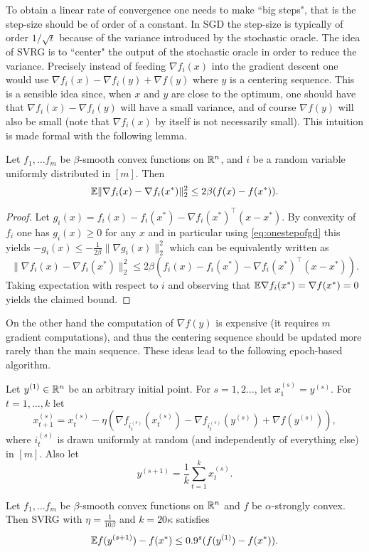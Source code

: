 To obtain a linear rate of convergence one needs to make ``big steps", that is the step-size should be of order of a constant. In SGD the step-size is typically of order $1/\sqrt{t}$ because of the variance introduced by the stochastic oracle. The idea of SVRG is to ``center" the output of the stochastic oracle in order to reduce the variance. Precisely instead of feeding $\nabla f_{i}(x)$ into the gradient descent one would use $\nabla f_i(x) - \nabla f_i(y) + \nabla f(y)$ where $y$ is a centering sequence. This is a sensible idea since, when $x$ and $y$ are close to the optimum, one should have that $\nabla f_i(x) - \nabla f_i(y)$ will have a small variance, and of course $\nabla f(y)$ will also be small (note that $\nabla f_i(x)$ by itself is not necessarily small). This intuition is made formal with the following lemma.
\begin{lemma} \label{lem:SVRG}
Let $f_1, \hdots f_m$ be $\beta$-smooth convex functions on $\mathbb{R}^n$, and $i$ be a random variable uniformly distributed in $[m]$. Then
$$\mathbb{E} \| \nabla f_i(x) - \nabla f_i(x^*) \|_2^2 \leq 2 \beta (f(x) - f(x^*)) .$$
\end{lemma}

\begin{proof}
Let $g_i(x) = f_i(x) - f_i(x^*) - \nabla f_i(x^*)^{\top} (x - x^*)$. By convexity of $f_i$ one has $g_i(x) \geq 0$ for any $x$ and in particular using \eqref{eq:onestepofgd} this yields $- g_i(x) \leq - \frac{1}{2\beta} \|\nabla g_i(x)\|_2^2$ which can be equivalently written as
$$\| \nabla f_i(x) - \nabla f_i(x^*) \|_2^2 \leq 2 \beta (f_i(x) - f_i(x^*) - \nabla f_i(x^*)^{\top} (x - x^*)) .$$
Taking expectation with respect to $i$ and observing that $\mathbb{E} \nabla f_i(x^*) = \nabla f(x^*) = 0$ yields the claimed bound.
\end{proof}
On the other hand the computation of $\nabla f(y)$ is expensive (it requires $m$ gradient computations), and thus the centering sequence should be updated more rarely than the main sequence. These ideas lead to the following epoch-based algorithm.

Let $y^{(1)} \in \mathbb{R}^n$ be an arbitrary initial point. For $s=1, 2 \ldots$, let $x_1^{(s)}=y^{(s)}$. For $t=1, \hdots, k$ let 
$$x_{t+1}^{(s)} = x_t^{(s)} - \eta \left( \nabla f_{i_t^{(s)}}(x_t^{(s)}) - \nabla f_{i_t^{(s)}} (y^{(s)}) + \nabla f(y^{(s)}) \right) ,$$
where $i_t^{(s)}$ is drawn uniformly at random (and independently of everything else) in $[m]$. Also let
$$y^{(s+1)} = \frac1{k} \sum_{t=1}^k x_t^{(s)} .$$

\begin{theorem} \label{th:SVRG}
Let $f_1, \hdots f_m$ be $\beta$-smooth convex functions on $\mathbb{R}^n$ and $f$ be $\alpha$-strongly convex. Then SVRG with $\eta = \frac{1}{10\beta}$ and $k = 20 \kappa$ satisfies
$$\mathbb{E} f(y^{(s+1)}) - f(x^*) \leq 0.9^s (f(y^{(1)}) - f(x^*)) .$$
\end{theorem}

